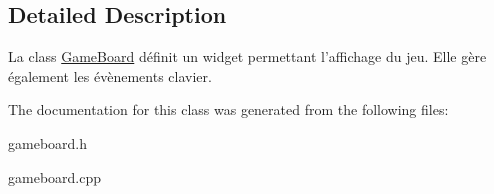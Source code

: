 \subsection{Detailed Description}
La class \hyperlink{classGameBoard}{Game\-Board} définit un widget permettant l'affichage du jeu. Elle gère également les évènements clavier. 

The documentation for this class was generated from the following files\-:\begin{DoxyCompactItemize}
\item 
gameboard.\-h\item 
gameboard.\-cpp\end{DoxyCompactItemize}

